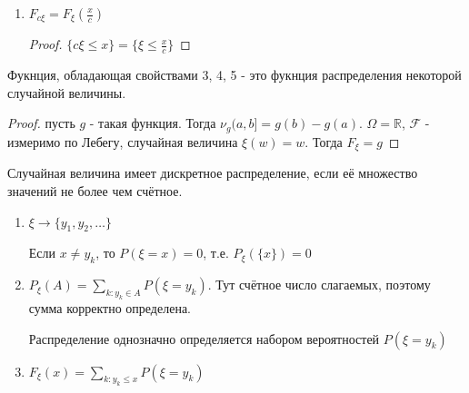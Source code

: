 \begin{properties}
\begin{enumerate}
{            \begin{proof}
                $\{ \xi + a \leqslant x \} = \{ \xi \leqslant x - a \}$
            \end{proof}
        }
        \item {
            $F_{c\xi} = F_{\xi} (\frac{x}{c})$

            \begin{proof}
                $\{ c\xi \leqslant x \} =  \{ \xi \leqslant \frac{x}{c} \}$
            \end{proof}
        }
    \end{enumerate}

    \begin{remark}
        Фукнция, обладающая свойствами 3, 4, 5 - это фукнция распределения
        некоторой случайной величины.

        \begin{proof}
            пусть $g$ - такая функция. Тогда $\nu_g (a, b] = g(b) - g(a)$. $\Omega = \mathbb{R}$, $\mathcal{F}$ - измеримо по Лебегу, случайная величина $\xi (w) = w$. Тогда $F_{\xi} = g$
        \end{proof}
    \end{remark}

\end{properties}

\begin{definition}
    Случайная величина имеет дискретное распределение, если её 
    множество значений не более чем счётное.

    \begin{remark}
        \begin{enumerate}
            \item { $\xi \to \{y_1, y_2, \ldots \}$

            Если $x \neq y_k$, то $P(\xi = x) = 0$, т.е. $P_{\xi}(\{ x \}) = 0$
            }

            \item { $P_{\xi} (A) = \sum_{k : y_k \in A} P(\xi = y_k)$. Тут счётное
            число слагаемых, поэтому сумма корректно определена.
    
            Распределение однозначно определяется набором вероятностей $P(\xi = y_k)$
            }
            \item {
                $F_{\xi} (x) = \sum_{k : y_k \leqslant x} P(\xi = y_k)$
            }
        \end{enumerate}
    \end{remark}
\end{definition}

